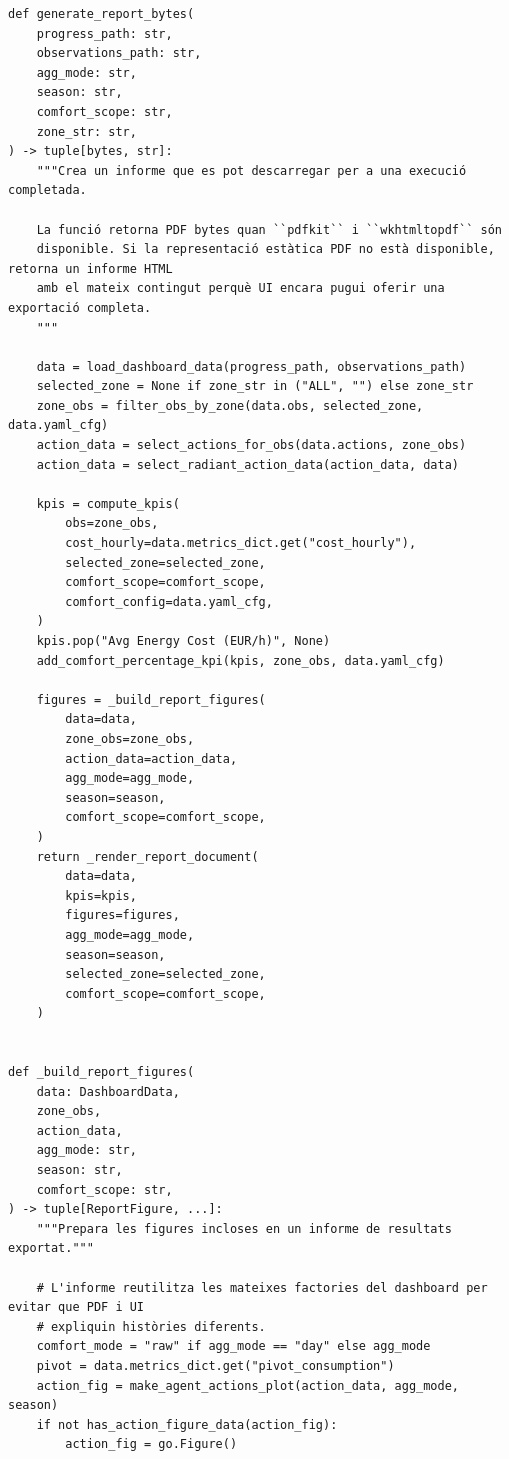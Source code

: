 \documentclass[10pt,a4paper]{article}
\begin{document}
\begin{lstlisting}[style=studioPython,caption={backend/resultats\_report\_backend.py},label={lst:backend-resultats-report-backend-py}]
def generate_report_bytes(
    progress_path: str,
    observations_path: str,
    agg_mode: str,
    season: str,
    comfort_scope: str,
    zone_str: str,
) -> tuple[bytes, str]:
    """Crea un informe que es pot descarregar per a una execució completada.

    La funció retorna PDF bytes quan ``pdfkit`` i ``wkhtmltopdf`` són
    disponible. Si la representació estàtica PDF no està disponible, retorna un informe HTML
    amb el mateix contingut perquè UI encara pugui oferir una exportació completa.
    """

    data = load_dashboard_data(progress_path, observations_path)
    selected_zone = None if zone_str in ("ALL", "") else zone_str
    zone_obs = filter_obs_by_zone(data.obs, selected_zone, data.yaml_cfg)
    action_data = select_actions_for_obs(data.actions, zone_obs)
    action_data = select_radiant_action_data(action_data, data)

    kpis = compute_kpis(
        obs=zone_obs,
        cost_hourly=data.metrics_dict.get("cost_hourly"),
        selected_zone=selected_zone,
        comfort_scope=comfort_scope,
        comfort_config=data.yaml_cfg,
    )
    kpis.pop("Avg Energy Cost (EUR/h)", None)
    add_comfort_percentage_kpi(kpis, zone_obs, data.yaml_cfg)

    figures = _build_report_figures(
        data=data,
        zone_obs=zone_obs,
        action_data=action_data,
        agg_mode=agg_mode,
        season=season,
        comfort_scope=comfort_scope,
    )
    return _render_report_document(
        data=data,
        kpis=kpis,
        figures=figures,
        agg_mode=agg_mode,
        season=season,
        selected_zone=selected_zone,
        comfort_scope=comfort_scope,
    )


def _build_report_figures(
    data: DashboardData,
    zone_obs,
    action_data,
    agg_mode: str,
    season: str,
    comfort_scope: str,
) -> tuple[ReportFigure, ...]:
    """Prepara les figures incloses en un informe de resultats exportat."""

    # L'informe reutilitza les mateixes factories del dashboard per evitar que PDF i UI
    # expliquin històries diferents.
    comfort_mode = "raw" if agg_mode == "day" else agg_mode
    pivot = data.metrics_dict.get("pivot_consumption")
    action_fig = make_agent_actions_plot(action_data, agg_mode, season)
    if not has_action_figure_data(action_fig):
        action_fig = go.Figure()


\end{lstlisting}
\end{document}
